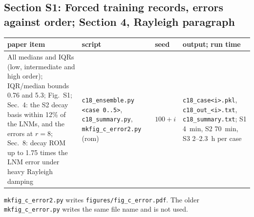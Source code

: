 \documentclass[10pt]{article}
\newcommand{\f}[1]{\texttt{#1}}
\begin{document}
\subsection*{Section S1: Forced training records, errors against order; Section 4, Rayleigh paragraph}
\begin{longtable}{L{0.31\textwidth}L{0.25\textwidth}L{0.08\textwidth}L{0.25\textwidth}}
\toprule
paper item & script & seed & output; run time\\ \midrule
All medians and IQRs (low, intermediate and high order); IQR/median bounds 0.76 and 5.3; Fig.~S1; Sec.~4: the S2 decay basis within 12\% of the LNMs, and the errors at $r=8$; Sec.~8: decay ROM up to 1.75 times the LNM error under heavy Rayleigh damping & \f{c18\_\allowbreak{}ensemble.py <case 0..5>}, \f{c18\_\allowbreak{}summary.py}, \f{mkfig\_\allowbreak{}c\_\allowbreak{}error2.py} (rom) & $100+i$ & \f{c18\_\allowbreak{}case<i>.pkl}, \f{c18\_\allowbreak{}out\_\allowbreak{}<i>.txt}, \f{c18\_\allowbreak{}summary.txt}; S1 4~min, S2 70~min, S3 2--2.3~h per case\\
\bottomrule
\end{longtable}
\f{mkfig\_\allowbreak{}c\_\allowbreak{}error2.py} writes \f{figures/\allowbreak{}fig\_\allowbreak{}c\_\allowbreak{}error.pdf}. The older \f{mkfig\_\allowbreak{}c\_\allowbreak{}error.py} writes the same file name and is not used.
\end{document}
